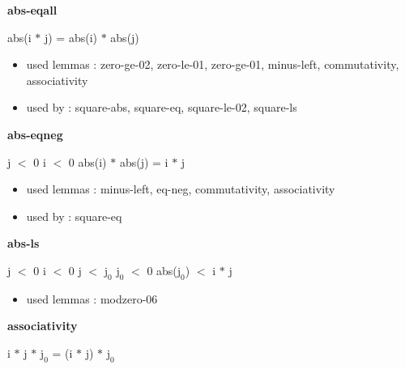 \documentclass[a4paper]{article}
\begin{document}
\raggedright
              
\bigskip

{\large\bf abs-eqall}

\medskip

 \Fol abs(i $*$ j) = abs(i) $*$ abs(j)

\begin{itemize}


\item       used lemmas  : zero-ge-02, zero-le-01, zero-ge-01, minus-left, commutativity, associativity
\item       used by      : square-abs, square-eq, square-le-02, square-ls

\end{itemize}

\medskip

\bigskip

{\large\bf abs-eqneg}

\medskip

 \Fol j $<$ 0 \And i $<$ 0 \Imp abs(i) $*$ abs(j) = i $*$ j

\begin{itemize}


\item       used lemmas  : minus-left, eq-neg, commutativity, associativity
\item       used by      : square-eq

\end{itemize}

\medskip

\bigskip

{\large\bf abs-ls}

\medskip

 \Fol j $<$ 0 \And i $<$ 0 \And j $<$ $\mbox{j}_{0}$ \And $\mbox{j}_{0}$ $<$ 0 \Imp abs($\mbox{j}_{0}$) $<$ i $*$ j

\begin{itemize}


\item       used lemmas  : modzero-06

\end{itemize}

\medskip

\bigskip

{\large\bf associativity}

\medskip

 \Fol i $*$ j $*$ $\mbox{j}_{0}$ = (i $*$ j) $*$ $\mbox{j}_{0}$
\end{document}

